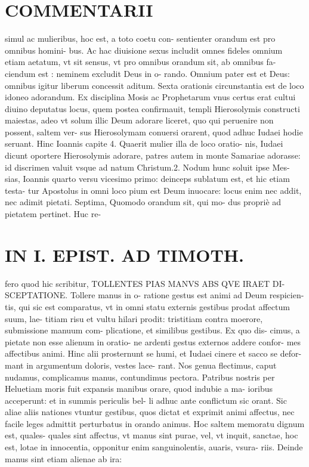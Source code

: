 \documentclass{article}
\begin{document}
\begin{pages}
\section*{COMMENTARII }\pstart simul ac mulieribus, hoc est, a toto coetu con- sentienter orandum est pro omnibus homini- bus. Ac hac diuisione sexus includit omnes fideles omnium etiam aetatum, vt sit sensus, vt pro omnibus orandum sit, ab omnibus fa- ciendum est : neminem excludit Deus in o- rando. Omnium pater est et Deus: omnibus igitur liberum concessit aditum.  \pend\pstart Sexta orationis circunstantia est de loco idoneo adorandum. Ex disciplina Mosis ac Prophetarum vnus certus erat cultui diuino deputatus locus, quem postea confirmauit, templi Hierosolymis constructi maiestas, adeo vt solum illic Deum adorare liceret, quo qui peruenire non possent, saltem ver- sus Hierosolymam conuersi orarent, quod adhuc Iudaei hodie seruant. Hinc Ioannis capite 4. Quaerit mulier illa de loco oratio- nis, Iudaei dicunt oportere Hierosolymis adorare, patres autem in monte Samariae adorasse: id discrimen valuit vsque ad natum Christum.2. Nodum hunc soluit ipse Mes- sias, Ioannis quarto versu vicesimo primo: deinceps sublatum est, et hic etiam testa- tur Apostolus in omni loco pium est Deum inuocare: locus enim nec addit, nec adimit pietati.  \pend\pstart Septima, Quomodo orandum sit, qui mo- dus propriè ad pietatem pertinet. Huc re-  \pend
\section*{IN I. EPIST. AD TIMOTH. }
\marginpar{[ p.53 ]}\pstart fero quod hic scribitur, TOLLENTES PIAS MANVS ABS QVE IRAET DI- SCEPTATIONE. Tollere manus in o- ratione gestus est animi ad Deum respicien- tis, qui sic est comparatus, vt in omni statu externis gestibus prodat affectum suum, lae- titiam risu et vultu hilari prodit: tristitiam contra moerore, submissione manuum com- plicatione, et similibus gestibus. Ex quo dis- cimus, a pietate non esse alienum in oratio- ne ardenti gestus externos addere confor- mes affectibus animi. Hinc alii prosternunt se humi, et Iudaei cinere et sacco se defor- mant in argumentum doloris, vestes lace- rant. Nos genua flectimus, caput nudamus, complicamus manus, contundimus pectora. Patribus nostris per Heluetiam moris fuit expansis manibus orare, quod indubie a ma- ioribus acceperunt: et in summis periculis bel- li adhuc ante conflictum sic orant.  \pend\pstart Sic aliae aliis nationes vtuntur gestibus, quos dictat et exprimit animi affectus, nec facile leges admittit perturbatus in orando animus.  \pend\pstart Hoc saltem memoratu dignum est, quales- quales sint affectus, vt manus sint purae, vel, vt inquit, sanctae, hoc est, lotae in innocentia, opponitur enim sanguinolentis, auaris, vsura- riis. Deinde manus sint etiam alienae ab ira:  \pend

\end{pages}
\end{document}
